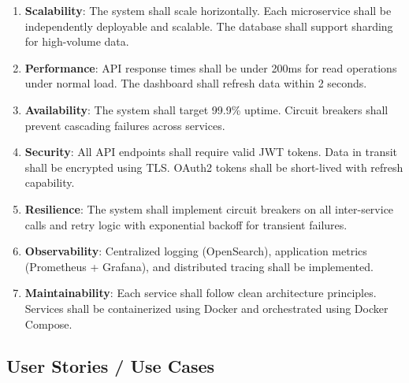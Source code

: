 \documentclass[12pt,a4paper]{article}
\begin{document}
\begin{enumerate}[label=\textbf{NFR-\arabic*}]
    \item \textbf{Scalability}: The system shall scale horizontally. Each microservice shall be independently deployable and scalable. The database shall support sharding for high-volume data.
    \item \textbf{Performance}: API response times shall be under 200ms for read operations under normal load. The dashboard shall refresh data within 2 seconds.
    \item \textbf{Availability}: The system shall target 99.9\% uptime. Circuit breakers shall prevent cascading failures across services.
    \item \textbf{Security}: All API endpoints shall require valid JWT tokens. Data in transit shall be encrypted using TLS. OAuth2 tokens shall be short-lived with refresh capability.
    \item \textbf{Resilience}: The system shall implement circuit breakers on all inter-service calls and retry logic with exponential backoff for transient failures.
    \item \textbf{Observability}: Centralized logging (OpenSearch), application metrics (Prometheus + Grafana), and distributed tracing shall be implemented.
    \item \textbf{Maintainability}: Each service shall follow clean architecture principles. Services shall be containerized using Docker and orchestrated using Docker Compose.
\end{enumerate}

\subsection{User Stories / Use Cases}
\end{document}
